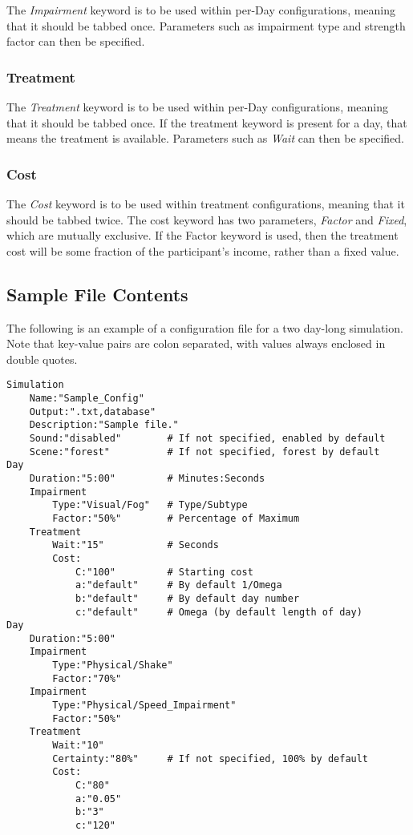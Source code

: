 \documentclass{article}
\begin{document}
The \textit{Impairment} keyword is to be used within per-Day configurations, meaning that it should be tabbed once. Parameters such as impairment type and strength factor can then be specified. 

\subsubsection*{Treatment}

The \textit{Treatment} keyword is to be used within per-Day configurations, meaning that it should be tabbed once. If the treatment keyword is present for a day, that means the treatment is available. Parameters such as \textit{Wait} can then be specified.

\subsubsection*{Cost}

The \textit{Cost} keyword is to be used within treatment configurations, meaning that it should be tabbed twice. The cost keyword has two parameters, \textit{Factor} and \textit{Fixed}, which are mutually exclusive. If the Factor keyword is used, then the treatment cost will be some fraction of the participant's income, rather than a fixed value.

\subsection*{Sample File Contents}
The following is an example of a configuration file for a two day-long simulation. Note that key-value pairs are colon separated, with values always enclosed in double quotes. 

\begin{lstlisting}
Simulation
    Name:"Sample_Config"
    Output:".txt,database"
    Description:"Sample file."	
    Sound:"disabled"        # If not specified, enabled by default
    Scene:"forest"          # If not specified, forest by default
Day
    Duration:"5:00"         # Minutes:Seconds
    Impairment
        Type:"Visual/Fog"   # Type/Subtype
        Factor:"50%"        # Percentage of Maximum
    Treatment
        Wait:"15"           # Seconds
        Cost:
            C:"100"         # Starting cost
            a:"default"     # By default 1/Omega
            b:"default"     # By default day number
            c:"default"     # Omega (by default length of day)
Day
    Duration:"5:00"
    Impairment
        Type:"Physical/Shake"
        Factor:"70%"
    Impairment
        Type:"Physical/Speed_Impairment"
        Factor:"50%"
    Treatment
        Wait:"10"   
        Certainty:"80%"     # If not specified, 100% by default
        Cost:
            C:"80"
            a:"0.05"
            b:"3"
            c:"120"
\end{lstlisting}
\end{document}
